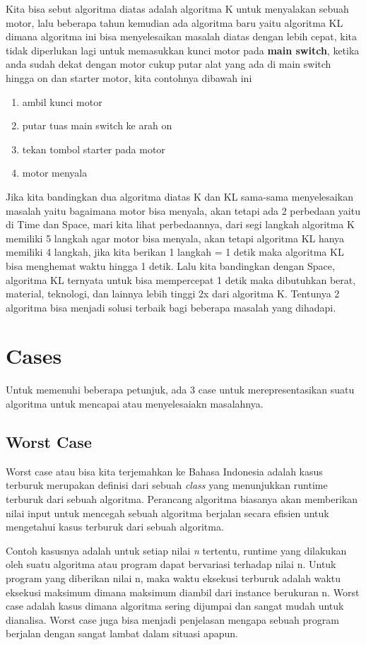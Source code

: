 Kita bisa sebut algoritma diatas adalah algoritma K untuk menyalakan sebuah motor, lalu beberapa tahun kemudian ada algoritma baru yaitu algoritma KL dimana algoritma ini bisa menyelesaikan masalah diatas dengan lebih cepat, kita tidak diperlukan lagi untuk memasukkan kunci motor pada \textbf{main switch}, ketika anda sudah dekat dengan motor cukup putar alat yang ada di main switch hingga on dan starter motor, kita contohnya dibawah ini
\begin{enumerate}
\item ambil kunci motor
\item putar tuas main switch ke arah on
\item tekan tombol starter pada motor
\item motor menyala
\end{enumerate}

Jika kita bandingkan dua algoritma diatas K dan KL sama-sama menyelesaikan masalah yaitu bagaimana motor bisa menyala, akan tetapi ada 2 perbedaan yaitu di Time dan Space, mari kita lihat perbedaannya, dari segi langkah algoritma K memiliki 5 langkah agar motor bisa menyala, akan tetapi algoritma KL hanya memiliki 4 langkah, jika kita berikan 1 langkah = 1 detik maka algoritma KL bisa menghemat waktu hingga 1 detik. Lalu kita bandingkan dengan Space, algoritma KL ternyata untuk bisa mempercepat 1 detik maka dibutuhkan berat, material, teknologi, dan lainnya lebih tinggi 2x dari algoritma K. Tentunya 2 algoritma bisa menjadi solusi terbaik bagi beberapa masalah yang dihadapi.

\section{Cases}
Untuk memenuhi beberapa petunjuk, ada 3 case untuk merepresentasikan suatu algoritma untuk mencapai atau menyelesaiakn masalahnya.

\subsection{Worst Case}
Worst case atau bisa kita terjemahkan ke Bahasa Indonesia adalah kasus terburuk merupakan definisi dari sebuah \textit{class} yang menunjukkan runtime terburuk dari sebuah algoritma. Perancang algoritma biasanya akan memberikan nilai input untuk mencegah sebuah algoritma berjalan secara efisien untuk mengetahui kasus terburuk dari sebuah algoritma.

Contoh kasusnya adalah untuk setiap nilai \textit{n} tertentu, runtime yang dilakukan oleh suatu algoritma atau program dapat bervariasi terhadap nilai n. Untuk program yang diberikan nilai n, maka waktu eksekusi terburuk adalah waktu eksekusi maksimum dimana maksimum diambil dari instance berukuran n. Worst case adalah kasus dimana algoritma sering dijumpai dan sangat mudah untuk dianalisa. Worst case juga bisa menjadi penjelasan mengapa sebuah program berjalan dengan sangat lambat dalam situasi apapun.

